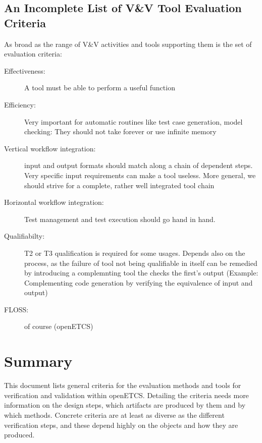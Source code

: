 \documentclass{template/openetcs_article}
\begin{document}
\subsection{An Incomplete List of V\&V Tool Evaluation Criteria}
As broad as the range of V\&V activities and tools supporting them is
the set of evaluation criteria:

\begin{description}
\item[Effectiveness:] A tool must be able to perform a useful function
\item[Efficiency:] Very important for automatic routines like test
  case generation, model checking: They should not take forever or use
  infinite memory
\item[Vertical workflow integration:] input and output formats should
  match along a chain of dependent steps. Very specific input
  requirements can make a tool useless. More general, we should strive
  for a complete, rather well integrated tool chain
\item[Horizontal workflow integration:] Test management and test
  execution should go hand in hand.
\item[Qualifiabilty:] T2 or T3 qualification is required for some
  usages. Depends also on the process, as the failure of tool not
  being qualifiable in itself can be remedied by introducing a
  complemnting tool the checks the first's output (Example:
  Complementing code generation by verifying the equivalence of input
  and output)
\item[FLOSS:] of course (openETCS)
\end{description}

\section{Summary}
\label{sec:summary}

This document lists general criteria for the evaluation methods and
tools for verification and validation within openETCS. Detailing the
criteria needs more information on the design steps, which artifacts
are produced by them and by which methods. Concrete criteria are at
least as diverse as the different verification steps, and these depend
highly on the objects and how they are produced.


%





\end{document}

